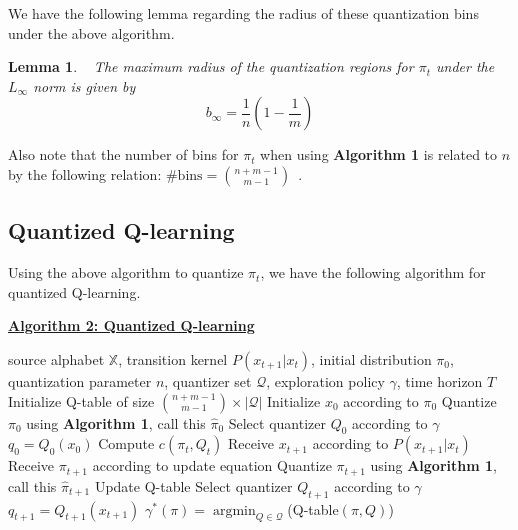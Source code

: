 \documentclass[conference]{IEEEtran}
\newtheorem{lemma}[theorem]{Lemma}
\DeclareMathOperator*{\argmin}{argmin}
\begin{document}
We have the following lemma regarding the radius of these quantization bins under the above algorithm.

\begin{lemma}\label{lemma:radius}~\cite[Proposition 2]{Reznik}
    The maximum radius of the quantization regions for \(\pi_t\) under the \( L_{\infty} \) norm is given by
    \[ b_{\infty} = \frac{1}{n}(1-\frac{1}{m}) \]
\end{lemma}

Also note that the number of bins for \( \pi_t \) when using \textbf{Algorithm 1} is related to \( n \) by the following relation: \( \text{\# bins} = {{n+m-1} \choose {m-1}} \)~\cite{Reznik}.

\subsection{Quantized Q-learning}\label{algorithm2}
Using the above algorithm to quantize \( \pi_t \), we have the following algorithm for quantized Q-learning.

\vspace{1em}

\noindent \underline{\textbf{Algorithm 2: Quantized Q-learning}}

\begin{algorithmic}[1]
    \REQUIRE source alphabet \(\mathbb{X}\), transition kernel \(P(x_{t+1} | x_t)\), initial distribution \(\pi_0\), quantization parameter \(n\), quantizer set \(\mathcal{Q}\), exploration policy \(\gamma\), time horizon \(T\)
    \STATE Initialize Q-table of size \( {{n+m-1} \choose {m-1}} \times |\mathcal{Q}| \)
    \STATE Initialize \( x_0 \) according to \( \pi_0 \)
    \STATE Quantize \( \pi_0 \) using \textbf{Algorithm 1}, call this \( \hat{\pi}_0 \)
    \STATE Select quantizer \( Q_0 \) according to \( \gamma \)
    \STATE \( q_0 = Q_0(x_0) \)
    \STATE Compute \(c(\pi_t, Q_t)\) 
    \STATE Receive \( x_{t+1} \) according to \( P(x_{t+1} | x_t) \)
    \STATE Receive \( \pi_{t+1} \) according to update equation 
    \STATE Quantize \( \pi_{t+1} \) using \textbf{Algorithm 1}, call this \( \hat{\pi}_{t+1} \)
    \STATE Update Q-table 
    \STATE Select quantizer \( Q_{t+1} \) according to \( \gamma \)
    \STATE \( q_{t+1} = Q_{t+1}(x_{t+1}) \)
    \ENDFOR
    \RETURN \(\gamma^*(\pi) = \argmin_{Q \in \mathcal{Q}}\)(Q-table\((\pi,Q)\))
\end{algorithmic}
\end{document}
